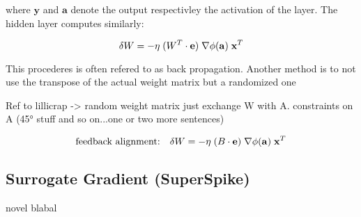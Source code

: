 where $\mathbf{y}$ and $\mathbf{a}$ denote the output respectivley the activation of the layer. The hidden layer computes similarly:

\begin{equation}
\delta W = - \eta \;
(W^T \cdot \mathbf{e}) \;
\nabla \phi(\mathbf{a}) \;
\mathbf{x}^T\\
\end{equation}

This procederes is often refered to as back propagation. Another method is to not use the transpose of the actual weight matrix but a randomized one 

Ref to lillicrap -> random weight matrix just exchange W with A. constraints on A (45° stuff and so on...one or two more sentences)

\begin{equation}
\text{feedback alignment:} \quad \delta W = - \eta \;
(B \cdot \mathbf{e}) \;
\nabla \phi(\mathbf{a}) \;
\mathbf{x}^T\;\\
\end{equation}

\subsection{Surrogate Gradient (SuperSpike)}

novel blabal


%
